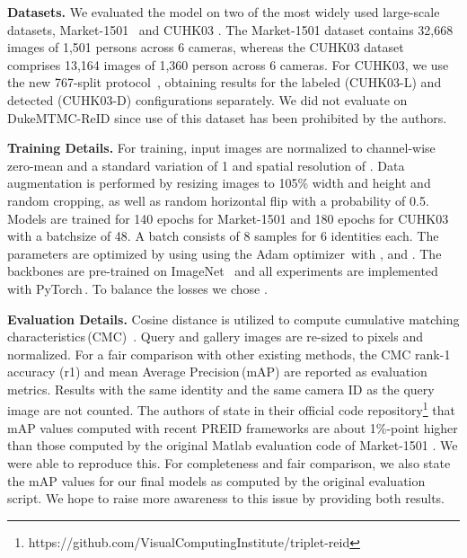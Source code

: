 \documentclass{article}
\newcommand{\nparagraph}[1]{\noindent\textbf{#1.  }}
\begin{document}
\nparagraph{Datasets} We evaluated the model on two of the most widely used large-scale datasets, Market-1501~\cite{zheng2015scalable} and CUHK03 \cite{li2014deepreid}. The Market-1501 dataset contains 32,668 images of 1,501 persons across 6 cameras, whereas the CUHK03 dataset comprises 13,164 images of 1,360 person across 6 cameras. For CUHK03, we use the new 767-split protocol~\cite{zhong2017re}, obtaining results for the labeled (CUHK03-L) and detected (CUHK03-D) configurations separately. We did not evaluate on DukeMTMC-ReID since use of this dataset has been prohibited by the authors.


\nparagraph{Training Details} For training, input images are normalized to channel-wise zero-mean and a standard variation of 1 and spatial resolution of . Data augmentation is performed by resizing images to 105\% width and height and random cropping, as well as random horizontal flip with a probability of 0.5. Models are trained for 140 epochs for Market-1501 and 180 epochs for CUHK03 with a batchsize of 48. A batch consists of 8 samples for 6 identities each. The parameters are optimized by using using the Adam optimizer\,\cite{kingma2014adam} with ,  and . The backbones are pre-trained on ImageNet~\cite{krizhevsky2012imagenet} and all experiments are implemented with PyTorch\,\cite{paszke2017automatic}. To balance the losses we chose .

\nparagraph{Evaluation Details} Cosine distance is utilized to compute cumulative matching characteristics\,(CMC)~\cite{moon2001computational}. Query and gallery images are re-sized to  pixels and normalized. For a fair comparison with other existing methods, the CMC rank-1 accuracy (r1) and mean Average Precision\,(mAP) are reported as evaluation metrics. Results with the same identity and the same camera ID as the query image are not counted. The authors of \cite{hermans2017defense} state in their official code repository\footnote{https://github.com/VisualComputingInstitute/triplet-reid} that mAP values computed with recent \ac{PREID} frameworks are about 1\%-point higher than those computed by the original Matlab evaluation code of Market-1501 \cite{zheng2015scalable}. We were able to reproduce this. For completeness and fair comparison, we also state the mAP values for our final models as computed by the original evaluation script. We hope to raise more awareness to this issue by providing both results.
\end{document}
